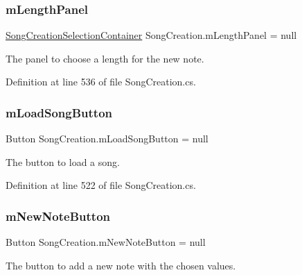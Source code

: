 \subsubsection{\texorpdfstring{m\+Length\+Panel}{mLengthPanel}}
{\footnotesize\ttfamily \hyperlink{class_song_creation_1_1_song_creation_selection_container}{Song\+Creation\+Selection\+Container} Song\+Creation.\+m\+Length\+Panel = null\hspace{0.3cm}{\ttfamily [private]}}



The panel to choose a length for the new note. 



Definition at line 536 of file Song\+Creation.\+cs.

\mbox{\label{group___s_c_priv_var_ga0e016451dff405f570bf530586fb36fa}} 
\subsubsection{\texorpdfstring{m\+Load\+Song\+Button}{mLoadSongButton}}
{\footnotesize\ttfamily Button Song\+Creation.\+m\+Load\+Song\+Button = null\hspace{0.3cm}{\ttfamily [private]}}



The button to load a song. 



Definition at line 522 of file Song\+Creation.\+cs.

\mbox{\label{group___s_c_priv_var_ga488ce0727c77abe7c84989241f4e55b4}} 
\subsubsection{\texorpdfstring{m\+New\+Note\+Button}{mNewNoteButton}}
{\footnotesize\ttfamily Button Song\+Creation.\+m\+New\+Note\+Button = null\hspace{0.3cm}{\ttfamily [private]}}



The button to add a new note with the chosen values. 



